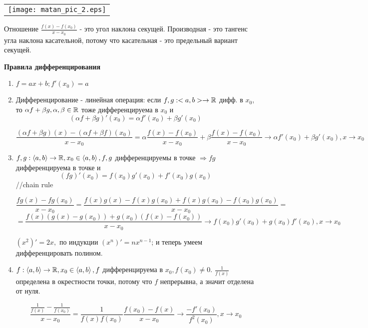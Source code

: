\documentclass[12pt]{report}
\begin{document}
\begin{note}

\begin{center}
\begin{tabular}{c}
\texttt{[image: matan\_pic\_2.eps]}\\
\end{tabular}
\end{center}

Отношение $\frac{f(x) - f(x_0)}{x - x_0}$ - это угол наклона секущей. Производная - это тангенс угла наклона касательной, потому что касательная - это предельный вариант секущей.
\end{note}

{\bfseries Правила дифференцирования}
\begin{enumerate}
\item $f = ax + b; f'(x_0) = a$

\item Дифференцирование - линейная операция: если $f, g: <a, b> \to \mathbb{R}$ дифф. в $x_0$, то $\alpha f + \beta g, \alpha, \beta \in \mathbb{R}$ тоже дифференцируема в $x_0$ и 
$$(\alpha f + \beta g)'(x_0) = \alpha f'(x_0) + \beta g'(x_0)$$

$$\frac{(\alpha f + \beta g)(x) - (\alpha f + \beta f)(x_0)}{x - x_0} = \alpha \frac{f(x) - f(x_0)}{x - x_0} + \beta \frac{f(x) - f(x_0)}{x - x_0} \to \alpha f'(x_0) + \beta g'(x_0), x \to x_0$$

\item $f, g: \left<a, b\right> \to \mathbb{R}, x_0 \in \left<a, b\right>, f, g$ дифференцируемы в точке $\Rightarrow fg$ дифференцируема в точке и
$$(fg)'(x_0) = f(x_0)g'(x_0) + f'(x_0)g(x_0)$$
//chain rule

$$\frac{fg(x) - fg(x_0)}{x - x_0} = \frac{f(x)g(x) - f(x)g(x_0) + f(x)g(x_0) - f(x_0)g(x_0)}{x - x_0} = $$
$$= \frac{f(x)(g(x) - g(x_0)) + g(x_0)(f(x) - f(x_0))}{x - x_0} \to f(x_0)g'(x_0) + g(x_0)f'(x_0), x \to x_0$$

\begin{cor}
$(x^2)' = 2x,$ по индукции $(x^n)' = nx^{n - 1}$; и теперь умеем дифференцировать полином.
\end{cor}

\item $f: \left<a, b\right> \to \mathbb{R}, x_0 \in \left<a, b\right>, f $ дифференцируема в $x_0, f(x_0) \neq 0$. $\frac{1}{f(x)}$ определена в окрестности точки, потому что $f$ непрерывна, а значит отделена от нуля.

$$\frac{\frac{1}{f(x)} - \frac{1}{f(x_0)}}{x - x_0} = \frac{1}{f(x)f(x_0)}\frac{f(x_0) - f(x)}{x - x_0} \to \frac{-f'(x_0)}{f^2(x_0)}, x \to x_0$$


\end{enumerate}
\end{document}
